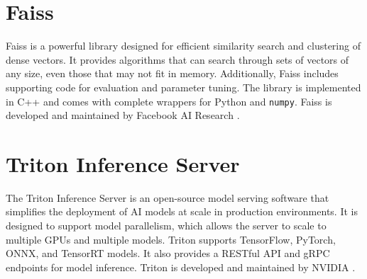 \section{Faiss}
Faiss is a powerful library designed for efficient similarity search and clustering of dense vectors. It provides algorithms that can search through sets of vectors of any size, even those that may not fit in memory. Additionally, Faiss includes supporting code for evaluation and parameter tuning. The library is implemented in C++ and comes with complete wrappers for Python and \texttt{numpy}. Faiss is developed and maintained by Facebook AI Research \cite{Faiss}.

\section{Triton Inference Server}
The Triton Inference Server is an open-source model serving software that simplifies the deployment of AI models at scale in production environments. It is designed to support model parallelism, which allows the server to scale to multiple GPUs and multiple models. Triton supports TensorFlow, PyTorch, ONNX, and TensorRT models. It also provides a RESTful API and gRPC endpoints for model inference. Triton is developed and maintained by NVIDIA \cite{TritonInferenceServer}.

